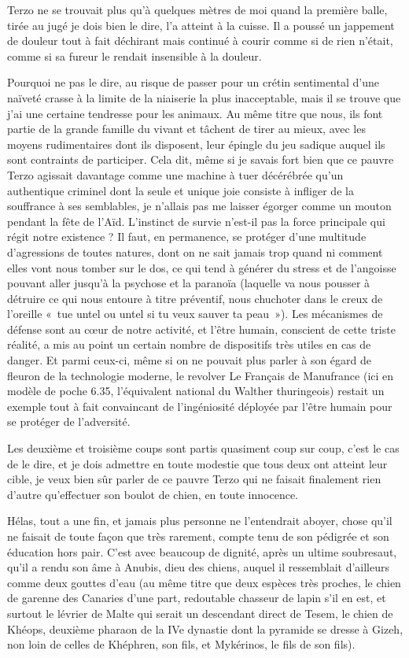 Terzo ne se trouvait plus qu’à quelques mètres de moi quand la première balle, tirée au jugé je dois bien le dire, l’a atteint à la cuisse. Il a poussé un jappement de douleur tout à fait déchirant mais continué à courir comme si de rien n’était, comme si sa fureur le rendait insensible à la douleur.

Pourquoi ne pas le dire, au risque de passer pour un crétin sentimental d’une naïveté crasse à la limite de la niaiserie la plus inacceptable, mais il se trouve que j’ai une certaine tendresse pour les animaux. Au même titre que nous, ils font partie de la grande famille du vivant et tâchent de tirer au mieux, avec les moyens rudimentaires dont ils disposent, leur épingle du jeu sadique auquel ils sont contraints de participer. Cela dit, même si je savais fort bien que ce pauvre Terzo agissait davantage comme une machine à tuer décérébrée qu’un authentique criminel dont la seule et unique joie consiste à infliger de la souffrance à ses semblables, je n’allais pas me laisser égorger comme un mouton pendant la fête de l’Aïd. L’instinct de survie n’est-il pas la force principale qui régit notre existence ? Il faut, en permanence, se protéger d’une multitude d’agressions de toutes natures, dont on ne sait jamais trop quand ni comment elles vont nous tomber sur le dos, ce qui tend à générer du stress et de l’angoisse pouvant aller jusqu’à la psychose et la paranoïa (laquelle va nous pousser à détruire ce qui nous entoure à titre préventif, nous chuchoter dans le creux de l’oreille «~tue untel ou untel si tu veux sauver ta peau~»). Les mécanismes de défense sont au cœur de notre activité, et l’être humain, conscient de cette triste réalité, a mis au point un certain nombre de dispositifs très utiles en cas de danger. Et parmi ceux-ci, même si on ne pouvait plus parler à son égard de fleuron de la technologie moderne, le revolver Le Français de Manufrance (ici en modèle de poche 6.35, l’équivalent national du Walther thuringeois) restait un exemple tout à fait convaincant de l’ingéniosité déployée par l’être humain pour se protéger de l’adversité.

Les deuxième et troisième coups sont partis quasiment coup sur coup, c’est le cas de le dire, et je dois admettre en toute modestie que tous deux ont atteint leur cible, je veux bien sûr parler de ce pauvre Terzo qui ne faisait finalement rien d’autre qu’effectuer son boulot de chien, en toute innocence.

Hélas, tout a une fin, et jamais plus personne ne l’entendrait aboyer, chose qu’il ne faisait de toute façon que très rarement, compte tenu de son pédigrée et son éducation hors pair. C’est avec beaucoup de dignité, après un ultime soubresaut, qu’il a rendu son âme à Anubis, dieu des chiens, auquel il ressemblait d’ailleurs comme deux gouttes d’eau (au même titre que deux espèces très proches, le chien de garenne des Canaries d’une part, redoutable chasseur de lapin s’il en est, et surtout le lévrier de Malte qui serait un descendant direct de Tesem, le chien de Khéops, deuxième pharaon de la IVe dynastie dont la pyramide se dresse à Gizeh, non loin de celles de Khéphren, son fils, et Mykérinos, le fils de son fils).

